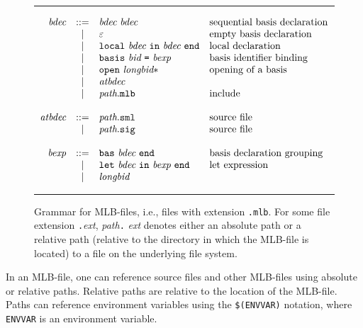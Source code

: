 \documentclass[12pt]{book}
\begin{document}
\begin{figure}
\hrule\medskip
\[
\begin{array}{rcll}
  \emph{bdec} & ::= & \emph{bdec}~ \emph{bdec} & \mbox{sequential~basis~declaration} \\
            & |   & \varepsilon & \mbox{empty~basis~declaration} \\
            & |   & \texttt{local}~ \emph{bdec}~\texttt{in}~\emph{bdec}~\texttt{end} & \mbox{local~declaration} \\
            & |   & \texttt{basis} ~\emph{bid}~\texttt{=}~\emph{bexp} & \mbox{basis~identifier~binding} \\
            & |   & \texttt{open} ~\emph{longbid}* & \mbox{opening~of~a~basis}\\
            & |   & \emph{atbdec} \\
            & |   & \emph{path}.\texttt{mlb} & \mbox{include} \\ \\
  \emph{atbdec} & ::= & \emph{path}.\texttt{sml} & \mbox{source~file} \\
              & |   & \emph{path}.\texttt{sig} & \mbox{source~file} \\ \\
  \emph{bexp} & ::= & \texttt{bas}~ \emph{bdec}~ \texttt{end} & \mbox{basis~declaration~grouping} \\
            & |   & \texttt{let}~\emph{bdec}~\texttt{in}~\emph{bexp}~\texttt{end} & \mbox{let~expression} \\
            & |   & \emph{longbid}
\end{array}
\]
\caption{Grammar for MLB-files, i.e., files with extension {\tt .mlb}. 
  For some file extension {\tt .}{\it ext}, {\it path}{\tt .}{\it
    ext\/} denotes either an absolute path or a relative path
  (relative to the directory in which the MLB-file is located) to
  a file on the underlying file system.}
\label{mlb_grammar.fig}
\medskip \hrule
\end{figure}
In an MLB-file, one can reference source files and other MLB-files
using absolute or relative
%
%
paths.  Relative paths are relative to the location of the MLB-file.
Paths can reference environment variables using the
\texttt{\$(ENVVAR)} notation, where \texttt{ENVVAR} is an environment
variable. 
\end{document}
